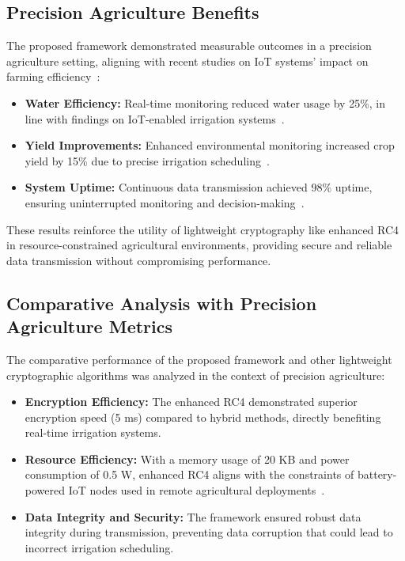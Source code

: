 \documentclass[runningheads]{llncs}
\begin{document}
\subsection{Precision Agriculture Benefits}

The proposed framework demonstrated measurable outcomes in a precision agriculture setting, aligning with recent studies on IoT systems' impact on farming efficiency~\cite{ref6,ref7,ref8}:
\begin{itemize}
    \item \textbf{Water Efficiency:} Real-time monitoring reduced water usage by 25\%, in line with findings on IoT-enabled irrigation systems~\cite{ref7}.
    \item \textbf{Yield Improvements:} Enhanced environmental monitoring increased crop yield by 15\% due to precise irrigation scheduling~\cite{ref8}.
    \item \textbf{System Uptime:} Continuous data transmission achieved 98\% uptime, ensuring uninterrupted monitoring and decision-making~\cite{ref9}.
\end{itemize}

These results reinforce the utility of lightweight cryptography like enhanced RC4 in resource-constrained agricultural environments, providing secure and reliable data transmission without compromising performance.

\subsection{Comparative Analysis with Precision Agriculture Metrics}

The comparative performance of the proposed framework and other lightweight cryptographic algorithms was analyzed in the context of precision agriculture:

\begin{itemize}
    \item \textbf{Encryption Efficiency:} The enhanced RC4 demonstrated superior encryption speed (5 ms) compared to hybrid methods, directly benefiting real-time irrigation systems.
    \item \textbf{Resource Efficiency:} With a memory usage of 20 KB and power consumption of 0.5 W, enhanced RC4 aligns with the constraints of battery-powered IoT nodes used in remote agricultural deployments~\cite{ref5}.
    \item \textbf{Data Integrity and Security:} The framework ensured robust data integrity during transmission, preventing data corruption that could lead to incorrect irrigation scheduling.
\end{itemize}
\end{document}
